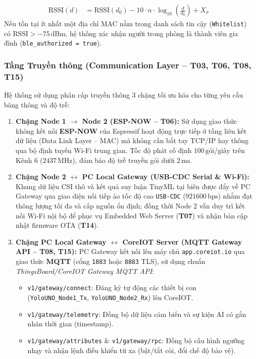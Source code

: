 \documentclass{hcmut-report}
\begin{document}
\begin{itemize}
  \begin{align}
    \text{RSSI}(d) &= \text{RSSI}(d_0) - 10 \cdot n \cdot \log_{10}\left(\frac{d}{d_0}\right) + X_\sigma \label{eq:ble_rssi}
  \end{align}
  Nếu tồn tại ít nhất một địa chỉ MAC nằm trong danh sách tin cậy (\texttt{Whitelist}) có $\text{RSSI} > -75\,\text{dBm}$, hệ thống xác nhận người trong phòng là thành viên gia đình (\texttt{ble\_authorized = true}).
\end{itemize}

\subsubsection[Tầng Truyền thông (T03, T06, T08, T15)]{Tầng Truyền thông (Communication Layer -- T03, T06, T08, T15)}
Hệ thống sử dụng phân cấp truyền thông 3 chặng tối ưu hóa cho từng yêu cầu băng thông và độ trễ:
\begin{enumerate}
  \item \textbf{Chặng Node 1 $\rightarrow$ Node 2 (ESP-NOW -- T06):} Sử dụng giao thức không kết nối \textbf{ESP-NOW} của Espressif hoạt động trực tiếp ở tầng liên kết dữ liệu (Data Link Layer -- MAC) mà không cần bắt tay TCP/IP hay thông qua bộ định tuyến Wi-Fi trung gian. Tốc độ phát cố định $100\,\text{gói/giây}$ trên Kênh 6 ($2437\,\text{MHz}$), đảm bảo độ trễ truyền gói dưới $2\,\text{ms}$.
  \item \textbf{Chặng Node 2 $\leftrightarrow$ PC Local Gateway (USB-CDC Serial \& Wi-Fi):} Khung dữ liệu CSI thô và kết quả suy luận TinyML tại biên được đẩy về PC Gateway qua giao diện nối tiếp ảo tốc độ cao \texttt{USB-CDC} ($921600\,\text{bps}$) nhằm đạt thông lượng tối đa và cấp nguồn ổn định; đồng thời Node 2 vẫn duy trì kết nối Wi-Fi nội bộ để phục vụ Embedded Web Server (\textbf{T07}) và nhận bản cập nhật firmware OTA (\textbf{T14}).
  \item \textbf{Chặng PC Local Gateway $\leftrightarrow$ CoreIOT Server (MQTT Gateway API -- T08, T15):} PC Gateway kết nối lên máy chủ \texttt{app.coreiot.io} qua giao thức \textbf{MQTT} (cổng \texttt{1883} hoặc \texttt{8883} TLS), sử dụng chuẩn \textit{ThingsBoard/CoreIOT Gateway MQTT API}:
  \begin{itemize}
    \item \texttt{v1/gateway/connect}: Đăng ký tự động các thiết bị con (\texttt{YoloUNO\_Node1\_Tx}, \texttt{YoloUNO\_Node2\_Rx}) lên CoreIOT.
    \item \texttt{v1/gateway/telemetry}: Đồng bộ dữ liệu cảm biến và sự kiện AI có gắn nhãn thời gian (timestamp).
    \item \texttt{v1/gateway/attributes} \& \texttt{v1/gateway/rpc}: Đồng bộ cấu hình ngưỡng nhạy và nhận lệnh điều khiển từ xa (bật/tắt còi, đổi chế độ bảo vệ).
  \end{itemize}
\end{enumerate}
\end{document}
